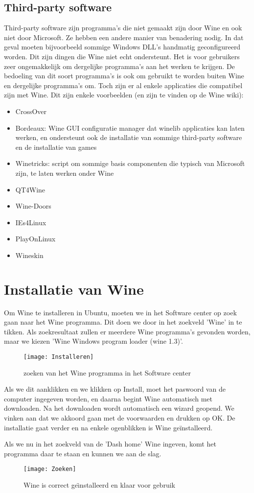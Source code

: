 \documentclass[12pt]{article}
\begin{document}
\subsection{Third-party software}
Third-party software zijn programma's die niet gemaakt zijn door Wine en ook niet door Microsoft. Ze hebben een andere manier van benadering nodig. In dat geval moeten bijvoorbeeld sommige Windows DLL's handmatig geconfigureerd worden. Dit zijn dingen die Wine niet echt ondersteunt. Het is voor gebruikers zeer ongemakkelijk om dergelijke programma's aan het werken te krijgen. De bedoeling van dit soort programma's is ook om gebruikt te worden buiten Wine en dergelijke programma's om. Toch zijn er al enkele applicaties die compatibel zijn met Wine. Dit zijn enkele voorbeelden (en zijn te vinden op de Wine wiki): 
\begin{itemize}
	\item CrossOver
	\item Bordeaux: Wine GUI configuratie manager dat winelib applicaties kan laten werken, en ondersteunt ook de installatie van sommige third-party software en de installatie van games
	\item Winetricks: script om sommige basis componenten die typisch van Microsoft zijn, te laten werken onder Wine
	\item QT4Wine
	\item Wine-Doors
	\item IEs4Linux
	\item PlayOnLinux
	\item Wineskin
\end{itemize}
\newpage
\section{Installatie van Wine}
Om Wine te installeren in Ubuntu, moeten we in het Software center op zoek gaan naar het Wine programma. Dit doen we door in het zoekveld 'Wine' in te tikken. Als zoekresultaat zullen er meerdere Wine programma's gevonden worden, maar we kiezen 'Wine Windows program loader (wine 1.3)'.
\begin{figure} [!ht]
\begin{center}
	\texttt{[image: Installeren]}
\end{center}
	\caption{zoeken van het Wine programma in het Software center}
\end{figure}

Als we dit aanklikken en we klikken op Install, moet het paswoord van de computer ingegeven worden, en daarna begint Wine automatisch met downloaden.
\newpage
Na het downloaden wordt automatisch een wizard geopend. We vinken aan dat we akkoord gaan met de voorwaarden en drukken op OK. De installatie gaat verder en na enkele ogenblikken is Wine geïnstalleerd.

Als we nu in het zoekveld van de 'Dash home' Wine ingeven, komt het programma daar te staan en kunnen we aan de slag.
\begin{figure} [!ht]
\begin{center}
	\texttt{[image: Zoeken]}
\end{center}
	\caption{Wine is correct ge\"{\i}nstalleerd en klaar voor gebruik}
\end{figure}
\end{document}
